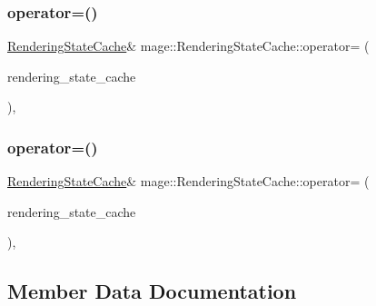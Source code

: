 \hypertarget{structmage_1_1_rendering_state_cache_a9534ceabde1d3f9f318f90d2ceec7646}{}\label{structmage_1_1_rendering_state_cache_a9534ceabde1d3f9f318f90d2ceec7646} 
\subsubsection{\texorpdfstring{operator=()}{operator=()}\hspace{0.1cm}{\footnotesize\ttfamily [1/2]}}
{\footnotesize\ttfamily \hyperlink{structmage_1_1_rendering_state_cache}{Rendering\+State\+Cache}\& mage\+::\+Rendering\+State\+Cache\+::operator= (\begin{DoxyParamCaption}\item[{const \hyperlink{structmage_1_1_rendering_state_cache}{Rendering\+State\+Cache} \&}]{rendering\+\_\+state\+\_\+cache }\end{DoxyParamCaption})\hspace{0.3cm}{\ttfamily [private]}, {\ttfamily [delete]}}

\hypertarget{structmage_1_1_rendering_state_cache_aac885d9a83e196299ac896b3847f471b}{}\label{structmage_1_1_rendering_state_cache_aac885d9a83e196299ac896b3847f471b} 
\subsubsection{\texorpdfstring{operator=()}{operator=()}\hspace{0.1cm}{\footnotesize\ttfamily [2/2]}}
{\footnotesize\ttfamily \hyperlink{structmage_1_1_rendering_state_cache}{Rendering\+State\+Cache}\& mage\+::\+Rendering\+State\+Cache\+::operator= (\begin{DoxyParamCaption}\item[{\hyperlink{structmage_1_1_rendering_state_cache}{Rendering\+State\+Cache} \&\&}]{rendering\+\_\+state\+\_\+cache }\end{DoxyParamCaption})\hspace{0.3cm}{\ttfamily [private]}, {\ttfamily [delete]}}



\subsection{Member Data Documentation}
\hypertarget{structmage_1_1_rendering_state_cache_ae29d186475c245d3eb5701005631c655}{}\label{structmage_1_1_rendering_state_cache_ae29d186475c245d3eb5701005631c655} 
